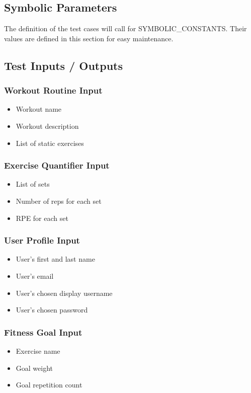 \documentclass[12pt, titlepage]{article}
\begin{document}
	\subsection{Symbolic Parameters}
	
	The definition of the test cases will call for SYMBOLIC\_CONSTANTS.
	Their values are defined in this section for easy maintenance.
	
	\subsection{Test Inputs / Outputs}
	\subsubsection{Workout Routine Input\label{WR-1-input}}
	\begin{itemize}
		\item Workout name
		\item Workout description
		\item List of static exercises
	\end{itemize}

	\subsubsection{Exercise Quantifier Input\label{QT-1-input}}
	\begin{itemize}
		\item List of sets
		\item Number of reps for each set
		\item RPE for each set
	\end{itemize}

	\subsubsection{User Profile Input\label{UP-1-input}}
	\begin{itemize}
		\item User's first and last name
		\item User's email
		\item User's chosen display username
		\item User's chosen password
	\end{itemize}

	\subsubsection{Fitness Goal Input\label{FG-1-input}}
	\begin{itemize}
		\item Exercise name
		\item Goal weight
		\item Goal repetition count
	\end{itemize}
\end{document}
